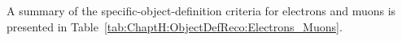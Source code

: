 A summary of the specific-object-definition criteria for electrons and muons is presented in Table~\ref{tab:ChaptH:ObjectDefReco:Electrons_Muons}.

\begin{comment}
The selection criteria for muons are summarised in the right column of Table~\ref{tab:ChaptH:ObjectDefReco:Electrons_Muons}.
Following the recommendations, preselected muons used for the overlap-removal process must satisfy: $\pt > 10$~GeV, $|\eta| < 2.5$, 
and the \texttt{medium} identification criteria. %
This \texttt{medium}-WP imposes conditions on the number of hits in the ID and MS subsystems, as well as 
on the significance of the charge-to-momentum ratio ($q/p$)~\cite{PERF-2015-10, MUON-2018-03,twiki-MuonSelection}. 
If a muon is flagged as ``bad' due to insufficient momentum resolution, the entire event is removed,
following the recommendations~\cite{twiki-MuonSelection}.
In addition to the criteria for preselected muons, muons selected for analysis regions are subject 
to the \texttt{PLImprovedTight} isolation requirement. This isolation criterion is applied to suppress 
contributions from misidentified or non-prompt muons~\cite{ATLAS:2022swp, ATLAS:2016lqx}. %

The recommended cuts for the longitudinal impact parameter and transverse 
impact parameter (d0) are applied to muon candidates. The reconstructed track 
associated with the muon must satisfy $|\zzsth| < 0.5\,$mm and $|\dzero| / \sigma(\dzero) < 3$. 
SFs for muon identification and isolation are applied as multiplicative factors to the MC-event weight. 
These SFs correct for the differences in efficiency between data and MC simulations. 
The details of these corrections can be found in the References~\cite{PERF-2015-10}.


\end{comment}
